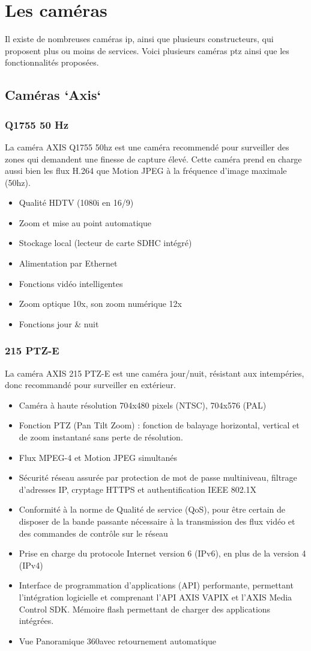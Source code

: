 \section{Les caméras}
Il existe de nombreuses caméras ip, ainsi que plusieurs constructeurs, qui
proposent plus ou moins de services. Voici plusieurs caméras ptz ainsi que les
fonctionnalités proposées.
\subsection{Caméras `Axis`}
\subsubsection{Q1755 50 Hz}
La caméra AXIS Q1755 50hz est une caméra recommendé pour surveiller des zones
qui demandent une finesse de capture élevé.
Cette caméra prend en charge aussi bien les flux H.264 que Motion JPEG à la
fréquence d'image maximale (50hz).
\begin{itemize}
  \item Qualité HDTV (1080i en 16/9)
  \item Zoom et mise au point automatique
  \item Stockage local (lecteur de carte SDHC intégré)
  \item Alimentation par Ethernet
  \item Fonctions vidéo intelligentes
  \item Zoom optique 10x, son zoom numérique 12x
  \item Fonctions jour \& nuit
\end{itemize}
\subsubsection{215 PTZ-E}
La caméra AXIS 215 PTZ-E est une caméra jour/nuit, résistant aux intempéries,
donc recommandé pour surveiller en extérieur.
\begin{itemize}
  \item Caméra à haute résolution 704x480 pixels (NTSC), 704x576 (PAL)
  \item Fonction PTZ (Pan Tilt Zoom) : fonction de balayage horizontal, vertical
  et de zoom instantané sans perte de résolution. 
  \item Flux MPEG-4 et Motion JPEG simultanés
  \item Sécurité réseau assurée par protection de mot de passe multiniveau,
  filtrage d’adresses IP, cryptage HTTPS et authentification IEEE 802.1X
  \item Conformité à la norme de Qualité de service (QoS), pour être certain de
  disposer de la bande passante nécessaire à la transmission des flux vidéo et
  des commandes de contrôle sur le réseau
  \item Prise en charge du protocole Internet version 6 (IPv6), en plus de la version 4 (IPv4)
  \item Interface de programmation d’applications (API) performante, permettant
  l’intégration logicielle et comprenant l’API AXIS VAPIX et l’AXIS Media
  Control SDK. Mémoire flash permettant de charger des applications intégrées.
  \item Vue Panoramique 360\degre avec retournement automatique
\end{itemize}
